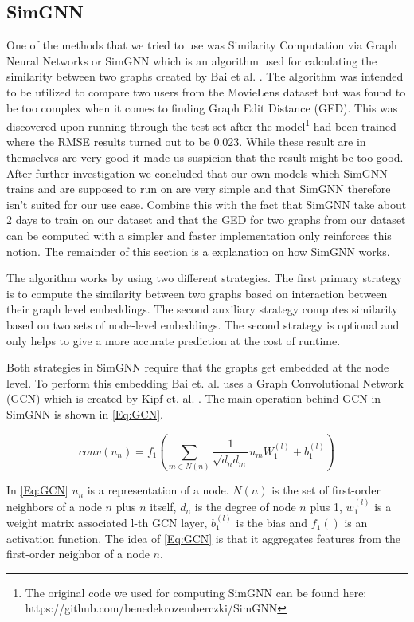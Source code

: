\subsection{SimGNN}\label{AP:SimGNN}
One of the methods that we tried to use was Similarity Computation via Graph Neural Networks or SimGNN which is an algorithm used for calculating the similarity between two graphs created by Bai et al. \cite{Bai2018}. The algorithm was intended to be utilized to compare two users from the MovieLens dataset but was found to be too complex when it comes to finding Graph Edit Distance (GED). This was discovered upon running through the test set after the model\footnote{The original code we used for computing SimGNN can be found here: https://github.com/benedekrozemberczki/SimGNN} had been trained where the RMSE results turned out to be 0.023. While these result are in themselves are very good it made us suspicion that the result might be too good. After further investigation we concluded that our own models which SimGNN  trains and are supposed to run on are very simple and that SimGNN therefore isn't suited for our use case. Combine this with the fact that SimGNN take about 2 days to train on our dataset and that the GED for two graphs from our dataset can be computed with a simpler and faster implementation only reinforces this notion. The remainder of this section is a explanation on how SimGNN works.



The algorithm works by using two different strategies. The first primary strategy is to compute the similarity between two graphs based on interaction between their graph level embeddings. The second auxiliary strategy computes similarity based on two sets of node-level embeddings. The second strategy is optional and only helps to give a more accurate prediction at the cost of runtime\cite{Bai2018}.

Both strategies in SimGNN require that the graphs get embedded at the node level. To perform this embedding Bai et. al. uses a Graph Convolutional Network (GCN)\cite{Bai2018} which is created by Kipf et. al. \cite{Kipf2016}. The main operation behind GCN in SimGNN is shown in \autoref{Eq:GCN}.


\begin{equation}\label{Eq:GCN}
conv(u_n)=f_1(\sum_{m \in N(n)} \frac{1}{\sqrt{d_nd_m}}u_mW_1^{(l)}+b_1^{(l)})
\end{equation}

In \autoref{Eq:GCN} $u_n$ is a representation of a node. $N(n)$ is the set of first-order neighbors of a node $n$ plus $n$ itself, $d_n$ is the degree of node $n$ plus 1, $w_1^{(l)}$ is a weight matrix associated l-th GCN layer, $b_1^{(l)}$ is the bias and $f_1()$ is an activation function. The idea of \autoref{Eq:GCN} is that it aggregates features from the first-order neighbor of a node $n$\cite{Bai2018}.


